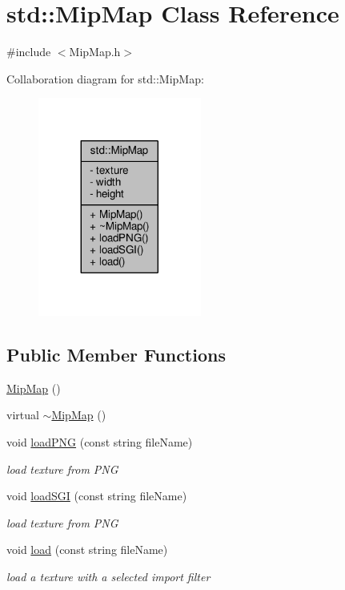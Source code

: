 \hypertarget{classstd_1_1MipMap}{}\section{std\+:\+:Mip\+Map Class Reference}
\label{classstd_1_1MipMap}


{\ttfamily \#include $<$Mip\+Map.\+h$>$}



Collaboration diagram for std\+:\+:Mip\+Map\+:\nopagebreak
\begin{figure}[H]
\begin{center}
\leavevmode
\includegraphics[width=152pt]{classstd_1_1MipMap__coll__graph}
\end{center}
\end{figure}
\subsection*{Public Member Functions}
\begin{DoxyCompactItemize}
\item 
\hyperlink{classstd_1_1MipMap_a2d764943a2f94d50e33c33234966e3f4}{Mip\+Map} ()
\item 
virtual \hyperlink{classstd_1_1MipMap_ac9d8e7ccf0a161b7ae7922ed53abbd6b}{$\sim$\+Mip\+Map} ()
\item 
void \hyperlink{classstd_1_1MipMap_a1b80afd35e90bc8395c33ed2d208f183}{load\+P\+N\+G} (const string file\+Name)
\begin{DoxyCompactList}\small\item\em load texture from P\+N\+G \end{DoxyCompactList}\item 
void \hyperlink{classstd_1_1MipMap_a623e530b676d04b9cd5b07fea6172602}{load\+S\+G\+I} (const string file\+Name)
\begin{DoxyCompactList}\small\item\em load texture from P\+N\+G \end{DoxyCompactList}\item 
void \hyperlink{classstd_1_1MipMap_aa52b162bb516ffe6b7fb5bdc3604ac7d}{load} (const string file\+Name)
\begin{DoxyCompactList}\small\item\em load a texture with a selected import filter \end{DoxyCompactList}\end{DoxyCompactItemize}
